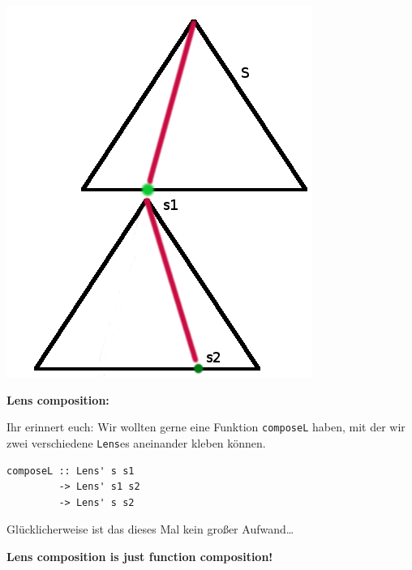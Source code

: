 \documentclass{beamer}
\begin{document}
\begin{frame}[fragile]

\begin{multicols}{2}
\includegraphics[scale=0.4]{lenses_compose.png} 

\columnbreak

\textbf{Lens composition:}\smallskip

Ihr erinnert euch: Wir wollten gerne eine Funktion \texttt{composeL} haben, mit der wir
zwei verschiedene \texttt{Lens}es aneinander kleben können. 

\begin{verbatim}
composeL :: Lens' s s1 
         -> Lens' s1 s2
         -> Lens' s s2
\end{verbatim}

Glücklicherweise ist das dieses Mal kein großer Aufwand\dots

\pause

\textbf{Lens composition is just function composition!}

\end{multicols}
\end{frame}

\end{document}
